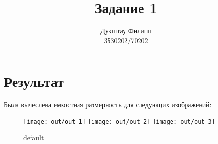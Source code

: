 \documentclass{article}
\title{Задание 1} %
\author{Дукштау Филипп \\ 3530202/70202} %
\begin{document}
\maketitle %


\section{Результат}

Была вычеслена емкостная размерность для следующих изображений:

\begin{figure}[htp]

\centering
\texttt{[image: out/out\_1]}\hfill
\texttt{[image: out/out\_2]}\hfill
\texttt{[image: out/out\_3]}

\caption{default}
\label{fig:figure3}

\end{figure}
\end{document}
